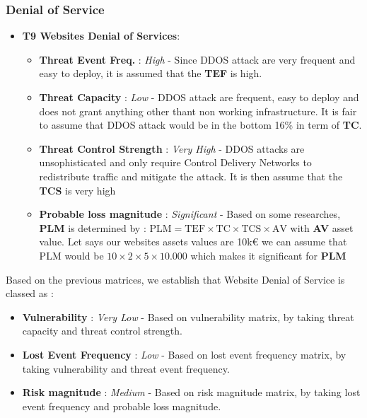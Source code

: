 \documentclass[12pt]{article}
\begin{document}
\subsubsection*{ Denial of Service }
\begin{itemize}
    \item \textbf{ T9 Websites Denial of Services}: 
        \begin{itemize}
            \item  \textbf{ Threat Event Freq. }: \textit{High} - Since DDOS attack are very frequent and easy to deploy, it is assumed that the \textbf{TEF} is high.
            \item  \textbf{ Threat Capacity }: \textit{Low} - DDOS attack are frequent, easy to deploy and does not grant anything other thant non working infrastructure. It is fair to assume that DDOS attack would be in the bottom 16\% in term of \textbf{TC}. 
            \item  \textbf{ Threat Control Strength }: \textit{Very High} - DDOS attacks are unsophisticated and only require Control Delivery Networks to redistribute traffic and mitigate the attack. It is then assume that the \textbf{TCS} is very high
            \item  \textbf{ Probable loss magnitude }: \textit{Significant} - Based on some researches, \textbf{PLM} is determined by : $\text{PLM} = \text{TEF} \times \text{TC} \times \text{TCS} \times \text{AV}$ with \textbf{AV} asset value. Let says our websites assets values are 10k€ we can assume that PLM would be $10 \times 2 \times 5 \times 10.000 $  which makes it significant for \textbf{PLM}
         \end{itemize}
\end{itemize}

Based on the previous matrices, we establish that Website Denial of Service is classed as :
\begin{itemize}
    \item \textbf{ Vulnerability } : \textit{Very Low} -  Based on vulnerability matrix, by taking threat capacity and threat control strength.
    \item \textbf{ Lost Event Frequency } : \textit{Low} - Based on lost event frequency matrix, by taking vulnerability and threat event frequency.
    \item  \textbf{ Risk magnitude } : \textit{Medium} - Based on risk magnitude matrix, by taking lost event frequency and probable loss magnitude.
\end{itemize}
\newpage
\end{document}
